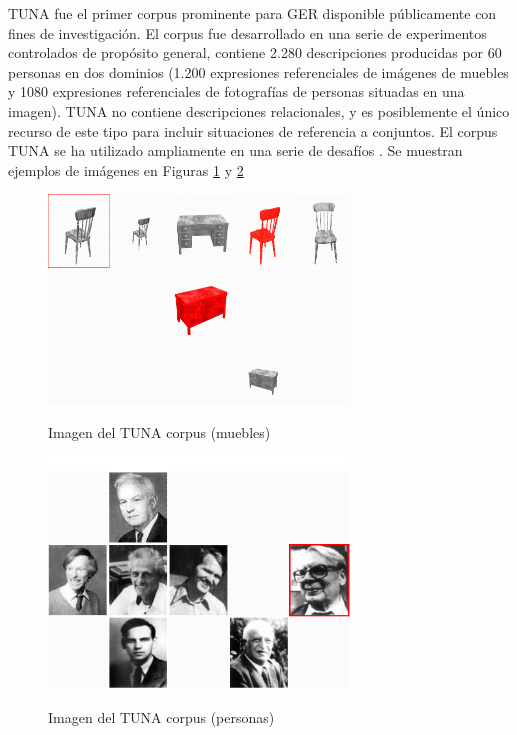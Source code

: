 TUNA \cite{tuna-corpus} fue el primer corpus prominente para GER disponible p\'ublicamente con fines de investigaci\'on. El corpus fue desarrollado en una serie de experimentos controlados de prop\'osito general, contiene 2.280 descripciones producidas por 60 personas en dos dominios (1.200 expresiones referenciales de im\'agenes de muebles y 1080 expresiones referenciales de fotograf\'ias de personas situadas en una imagen). TUNA no contiene descripciones relacionales, y es posiblemente el \'unico recurso de este tipo para incluir situaciones de referencia a conjuntos. El corpus TUNA se ha utilizado ampliamente en una serie de desaf\'ios \cite{reg2009}. Se muestran ejemplos de im\'agenes en Figuras \ref{fig-TUNA-furniture} y \ref{fig-TUNA-people}
\begin{figure}
\centering
\includegraphics[width=8cm]{images/largeGreyChair.jpg}\\[0pt]
\caption{Imagen del TUNA corpus (muebles)}
\label{fig-TUNA-furniture}
\end{figure}
\begin{figure}
\centering
\includegraphics[width=8cm]{images/tuna-people.jpg}\\[0pt]
\caption{Imagen del TUNA corpus (personas)}
\label{fig-TUNA-people}
\end{figure}


